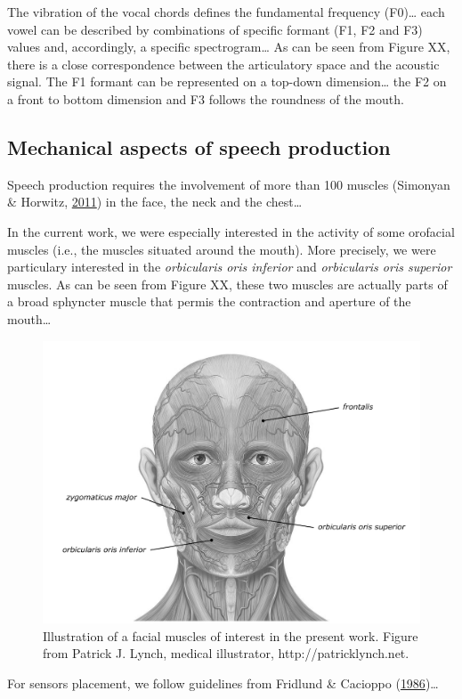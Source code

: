 \documentclass[a4paper,12pt,twoside,openright,oldfontcommands]{memoir}
\begin{document}
The vibration of the vocal chords defines the fundamental frequency
(F0)\ldots{} each vowel can be described by combinations of specific
formant (F1, F2 and F3) values and, accordingly, a specific
spectrogram\ldots{} As can be seen from Figure XX, there is a close
correspondence between the articulatory space and the acoustic signal.
The F1 formant can be represented on a top-down dimension\ldots{} the F2
on a front to bottom dimension and F3 follows the roundness of the
mouth.

\subsection{Mechanical aspects of speech
production}\label{mechanical-aspects-of-speech-production}

Speech production requires the involvement of more than 100 muscles
(Simonyan \& Horwitz,
\protect\hyperlink{ref-simonyan_laryngeal_2011}{2011}) in the face, the
neck and the chest\ldots{}

In the current work, we were especially interested in the activity of
some orofacial muscles (i.e., the muscles situated around the mouth).
More precisely, we were particulary interested in the \emph{orbicularis
oris inferior} and \emph{orbicularis oris superior} muscles. As can be
seen from Figure XX, these two muscles are actually parts of a broad
sphyncter muscle that permis the contraction and aperture of the
mouth\ldots{}

\begin{figure}[H]

{\centering \includegraphics[width=0.5\linewidth]{assets/facial_muscles} 

}

\caption{Illustration of a facial muscles of interest in the present work. Figure from Patrick J. Lynch, medical illustrator, http://patricklynch.net.}\label{fig:facial}
\end{figure}

For sensors placement, we follow guidelines from Fridlund \& Cacioppo
(\protect\hyperlink{ref-fridlund_guidelines_1986}{1986})\ldots{}
\end{document}
